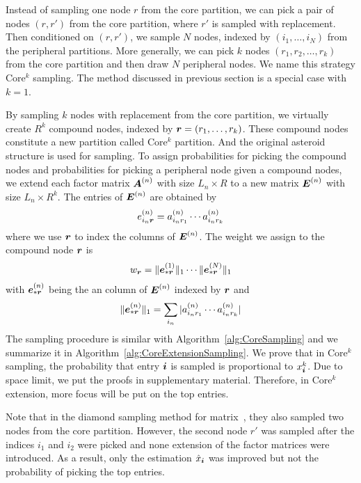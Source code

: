 \documentclass[letterpaper]{article}
\newcommand{\Sca}[3]{{#1}^{(#2)}_{i_#2#3}}%
\newcommand{\anr}[2]{\Sca{a}{#1}{#2}}
\newcommand{\enr}[2]{\Sca{e}{#1}{\V{#2}}}
\newcommand{\V}[1]{{\boldsymbol{{\MakeLowercase{#1}}}}}
\newcommand{\ColVec}[3]{\V{#1}^{(#2)}_{#3}}
\newcommand{\NormColE}[2]{\norm{\ColVec{e}{#1}{*\V{#2}}}{1}}
\newcommand{\predx}{\hat{x}_{\V{i}}}
\newcommand{\M}[1]{{\boldsymbol{{\MakeUppercase{#1}}}}}
\newcommand{\FacMat}[2]{\M{#1}^{(#2)}}
\newcommand{\norm}[2]{\|#1\|_{#2}}
\newcommand{\Alg}[1]{Algorithm~\ref{alg:#1}}
\begin{document}
Instead of sampling one node $r$ from the core partition, 
we can pick a pair of nodes $(r,r')$ from the core partition, 
where $r'$ is sampled with replacement. 
Then conditioned on $(r,r')$, we sample $N$ nodes, 
indexed by $(i_1,\ldots,i_N)$ from the peripheral partitions. 
More generally, we can pick $k$ nodes $(r_1,r_2,\ldots,r_k)$ from the core partition 
and then draw $N$ peripheral nodes. 
We name this strategy Core$^k$ sampling. 
The method discussed in previous section is a special case with $k=1$.

By sampling $k$ nodes with replacement from the core partition, 
we virtually create $R^k$ compound nodes, 
indexed by $\V{r}=(r_1,\ldots,r_k)$. 
These compound nodes constitute a new partition called Core$^k$ partition. 
And the original asteroid structure is used for sampling.
To assign probabilities for picking the compound nodes and probabilities for picking a peripheral node given a compound nodes, 
we extend each factor matrix $\FacMat{A}{n}$ with size $L_n\times R$ to a new matrix $\M{E}^{(n)}$ with size $L_n\times R^k$. 
The entries of $\M{E}^{(n)}$ are obtained by
\begin{align}
\enr{n}{r} = \anr{n}{r_1}\cdots\anr{n}{r_k}
\end{align}
where we use $\V{r}$ to index the columns of $\M{E}^{(n)}$. The weight we assign to the compound node $\V{r}$ is
\begin{align}
w_{\V{r}} = \NormColE{1}{r}\cdots\NormColE{N}{r}
\end{align}
with $\V{e}_{*\V{r}}^{(n)}$ being the an column of $\M{E}^{(n)}$ indexed by $\V{r}$ and
\begin{align}
\NormColE{n}{r} = \sum_{i_n}|\anr{n}{r_1}\cdots\anr{n}{r_k}|
\end{align}
The sampling procedure is similar with \Alg{CoreSampling} 
and we summarize it in \Alg{CoreExtensionSampling}. 
We prove that in Core$^k$ sampling,
the probability that entry $\V{i}$ is sampled is proportional to $x_{\V{i}}^k$.
Due to space limit, we put the proofs in supplementary material.
Therefore, in Core$^k$ extension, more focus will be put on the top entries.

Note that in the diamond sampling method for matrix~\cite{BaPiKoSe15}, 
they also sampled two nodes from the core partition. 
However, the second node $r'$ was sampled after the indices $i_1$ and $i_2$ were picked 
and none extension of the factor matrices were introduced. 
As a result, only the estimation $\predx$ was improved 
but not the probability of picking the top entries.
\end{document}
